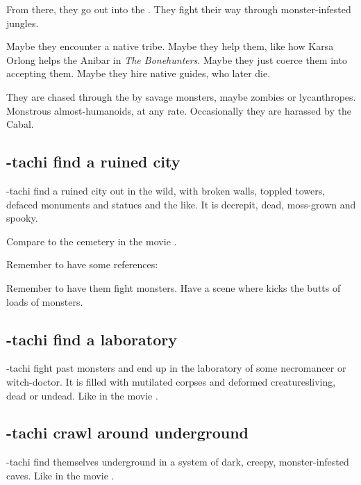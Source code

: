 \begin{garbage}
From there, they go out into the \Wylde{}. They fight their way through monster-infested jungles. 

Maybe they encounter a native tribe. Maybe they help them, like how Karsa Orlong helps the Anibar in \emph{The Bonehunters}. Maybe they just coerce them into accepting them. Maybe they hire native guides, who later die. 

They are chased through the \Wylde{} by savage monsters, maybe zombies or lycanthropes. Monstrous almost-humanoids, at any rate. Occasionally they are harassed by the Cabal. 







\subsection{\Shilred-tachi find a ruined city}
\Shilred-tachi find a ruined city out in the wild, with broken walls, toppled towers, defaced monuments and statues and the like. It is decrepit, dead, moss-grown and spooky. 

Compare to the cemetery in the movie \cite{Movie:HouseoftheDead}. 

Remember to have some references: 

Remember to have them fight monsters. Have a scene where \Dzasselid{} kicks the butts of loads of monsters. 







\subsection{\Shilred-tachi find a laboratory}
\Shilred-tachi fight past monsters and end up in the laboratory of some necromancer or witch-doctor. It is filled with mutilated corpses and deformed creatures\dash living, dead or undead. Like in the movie \cite{Movie:HouseoftheDead}. 







\subsection{\Shilred-tachi crawl around underground}
\Shilred-tachi find themselves underground in a system of dark, creepy, monster-infested caves. Like in the movie \cite{Movie:HouseoftheDead}. 









\end{garbage}
